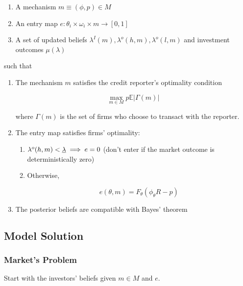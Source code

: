 \documentclass{article}
\begin{document}
\begin{enumerate}
    \item A mechanism $m \equiv (\phi, p) \in M$
    \item An entry map $e: \theta_i \times \omega_i \times m \to [0, 1]$ 
    \item A set of updated beliefs $\lambda^I(m), \lambda^o(h, m), \lambda^o(l, m)$ and investment outcomes $\mu(\lambda)$
\end{enumerate}

such that 

\begin{enumerate}
    \item The mechanism $m$ satisfies the credit reporter's optimality condition 
    
    \[ \max_{m \in M} p \mathbb{E} |\Gamma(m)| \]

    where $\Gamma(m)$ is the set of firms who choose to transact with the reporter. 

    \item The entry map satisfies firms' optimality: 
    
    \begin{enumerate}
        \item $\lambda^o(h, m) < \uline{\lambda} \implies e = 0$ (don't enter if the market outcome is deterministically zero)
        \item Otherwise, 
        
        \begin{equation}
            e(\theta, m) = F_\theta(\phi_\theta R - p)
        \end{equation} 
    \end{enumerate}

    \item The posterior beliefs are compatible with Bayes' theorem 
\end{enumerate}

\newpage 

\subsection*{Model Solution} 

\subsubsection*{Market's Problem}

Start with the investors' beliefs given $m \in M$ and $e$.
\end{document}
